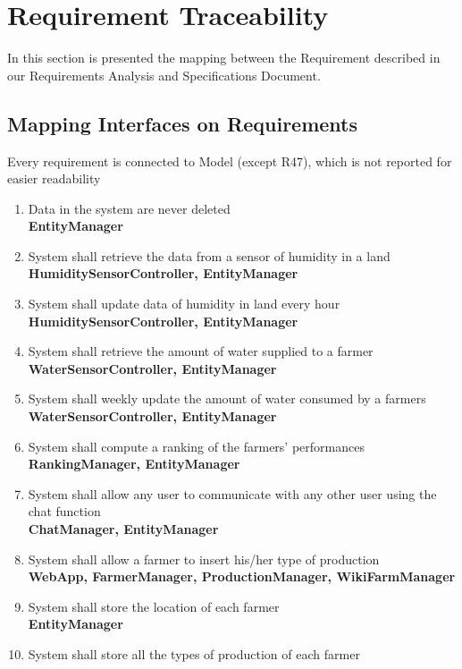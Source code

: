 \section{Requirement Traceability}
In this section is presented the mapping between the Requirement described in our Requirements Analysis and Specifications Document.
\subsection{Mapping Interfaces on Requirements}
Every requirement is connected to Model (except R47), which is not reported for easier readability
\begin{enumerate} [label=\textbf{R.\arabic*}]
    \item Data in the system are never deleted\\
        \textbf{EntityManager}
    \item System shall retrieve the data from a sensor of humidity in a land\\
        \textbf{HumiditySensorController, EntityManager}
    \item System shall update data of humidity in land every hour\\
        \textbf{HumiditySensorController, EntityManager}
    \item System shall retrieve the amount of water supplied to a farmer\\
        \textbf{WaterSensorController, EntityManager}
    \item System shall weekly update the amount of water consumed by a farmers\\
        \textbf{WaterSensorController, EntityManager}
    \item System shall compute a ranking of the farmers’ performances\\
        \textbf{RankingManager, EntityManager}
    \item System shall allow any user to communicate with any other user using the chat function\\
        \textbf{ChatManager, EntityManager}
    \item System shall allow a farmer to insert his/her type of production\\
        \textbf{WebApp, FarmerManager, ProductionManager, WikiFarmManager}
    \item System shall store the location of each farmer\\
        \textbf{EntityManager}
    \item System shall store all the types of production of each farmer\\

\end{enumerate}
